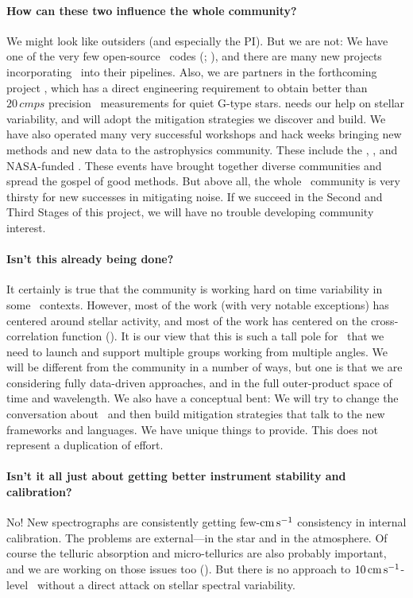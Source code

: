 \documentclass[12pt, letterpaper]{article}
\begin{document}
\paragraph{How can these two influence the whole community?}
We might look like outsiders (and especially the PI).
But we are not: We have one of the very few open-source \EPRV\ codes
(\wobble; \citealt{Bedell2019}), and there are many new projects incorporating 
\wobble\ into their pipelines.
Also, we are partners in the forthcoming  project
, which has a direct engineering
requirement to obtain better than $20\,cmps$ precision
\RV\ measurements for quiet G-type stars.
 needs our help on stellar variability, and will adopt
the mitigation strategies we discover and build.
We have also operated many very successful workshops and hack weeks
bringing new methods and new data to the astrophysics community.
These include the , , and NASA-funded .
These events have brought together diverse communities and spread
the gospel of good methods.
But above all, the whole \EPRV\ community is very thirsty for new
successes in mitigating noise. If we succeed in the Second and Third
Stages of this project, we will have no trouble developing community
interest.

\paragraph{Isn't this already being done?}
It certainly is true that the community is working hard on time
variability in some \EPRV\ contexts.
However, most of the work (with very notable exceptions) has centered
around stellar activity, and most of the work has centered on the
cross-correlation function (\CCF).
It is our view that this is such a tall pole for \EPRV\ that we need
to launch and support multiple groups working from multiple angles.
We will be different from the community in a number of ways, but one
is that we are considering fully data-driven approaches, and in the
full outer-product space of time and wavelength.
We also have a conceptual bent: We will try to change the conversation
about \EPRV\ and then build mitigation strategies that talk to the
new frameworks and languages.
We have unique things to provide.
This does not represent a duplication of effort.

\paragraph{Isn't it all just about getting better instrument stability and calibration?}
No! New spectrographs are consistently getting few-${\mathrm{cm\,s^{-1}}}$ consistency
in internal calibration.
The problems are external---in the star and in the atmosphere.
Of course the telluric absorption and micro-tellurics are also
probably important, and we are working on those issues too (\citealt{Bedell2019}).
But there is no approach to $10\,{\mathrm{cm\,s^{-1}}}$-level \EPRV\ without a direct
attack on stellar spectral variability.
\end{document}
